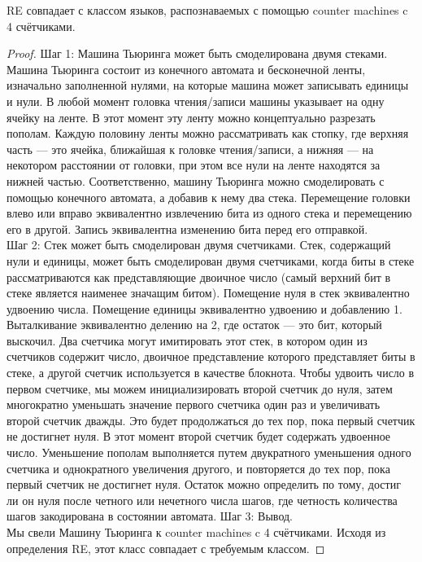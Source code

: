     \begin{Thm}
         RE совпадает с классом языков, распознаваемых с помощью counter machines c 4 счётчиками.
    \end{Thm}
    \begin{proof}
        Шаг 1: Машина Тьюринга может быть смоделирована двумя стеками.\\
        Машина Тьюринга состоит из конечного автомата и бесконечной ленты, изначально заполненной нулями, на которые машина может записывать единицы и нули. В любой момент головка чтения/записи машины указывает на одну ячейку на ленте. В этот момент эту ленту можно концептуально разрезать пополам. Каждую половину ленты можно рассматривать как стопку, где верхняя часть — это ячейка, ближайшая к головке чтения/записи, а нижняя — на некотором расстоянии от головки, при этом все нули на ленте находятся за нижней частью. Соответственно, машину Тьюринга можно смоделировать с помощью конечного автомата, а добавив к нему два стека. Перемещение головки влево или вправо эквивалентно извлечению бита из одного стека и перемещению его в другой. Запись эквивалентна изменению бита перед его отправкой.\\
        Шаг 2: Стек может быть смоделирован двумя счетчиками. 
        Стек, содержащий нули и единицы, может быть смоделирован двумя счетчиками, когда биты в стеке рассматриваются как представляющие двоичное число (самый верхний бит в стеке является наименее значащим битом). Помещение нуля в стек эквивалентно удвоению числа. Помещение единицы эквивалентно удвоению и добавлению 1. Выталкивание эквивалентно делению на 2, где остаток --- это бит, который выскочил. Два счетчика могут имитировать этот стек, в котором один из счетчиков содержит число, двоичное представление которого представляет биты в стеке, а другой счетчик используется в качестве блокнота. Чтобы удвоить число в первом счетчике, мы можем инициализировать второй счетчик до нуля, затем многократно уменьшать значение первого счетчика один раз и увеличивать второй счетчик дважды. Это будет продолжаться до тех пор, пока первый счетчик не достигнет нуля. В этот момент второй счетчик будет содержать удвоенное число. Уменьшение пополам выполняется путем двукратного уменьшения одного счетчика и однократного увеличения другого, и повторяется до тех пор, пока первый счетчик не достигнет нуля. Остаток можно определить по тому, достиг ли он нуля после четного или нечетного числа шагов, где четность количества шагов закодирована в состоянии автомата.
        Шаг 3: Вывод.\\
        Мы свели Машину Тьюринга к counter machines c 4 счётчиками. Исходя из определения RE, этот класс совпадает с требуемым классом.
    \end{proof}
    
